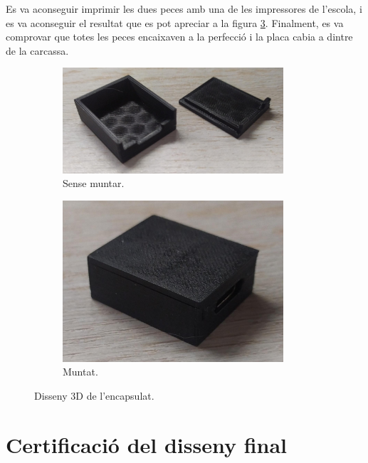Es va aconseguir imprimir les dues peces amb una de les impressores de
l'escola, i es va aconseguir el resultat que es pot apreciar a la figura
\ref{fig:3d_real}. Finalment, es va comprovar que totes les peces encaixaven a la
perfecció i la placa cabia a dintre de la carcassa.

\begin{figure}[ht]
    \centering
    \begin{subfigure}{0.50\textwidth}
        \centering
        \includegraphics[width=0.9\textwidth]{images/device/3d_unmounted.jpeg}
        \caption{Sense muntar.}
        \label{fig:3d_real_unmounted}
    \end{subfigure}
    \begin{subfigure}{0.4\textwidth}
        \centering
        \includegraphics[width=0.9\textwidth]{images/device/3d_mounted.jpeg}
        \caption{Muntat.}
        \label{fig:3d_real_mounted}
    \end{subfigure}
    \caption{Disseny 3D de l'encapsulat.}
    \label{fig:3d_real}
\end{figure}

\section{Certificació del disseny final}

